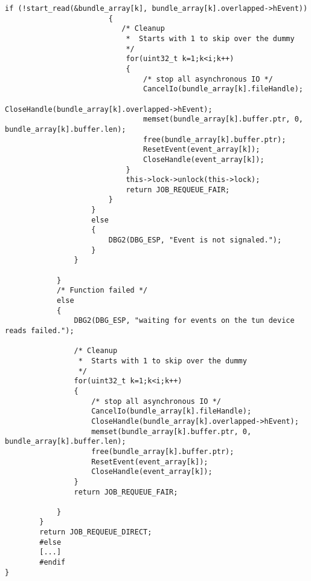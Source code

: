 \begin{lstlisting}[caption=Code für handle\_plain auf Windows,label=lst:handle-plain-windows]
                        if (!start_read(&bundle_array[k], bundle_array[k].overlapped->hEvent))
                        {
                           /* Cleanup
                            *  Starts with 1 to skip over the dummy
                            */
                            for(uint32_t k=1;k<i;k++)
                            {
                                /* stop all asynchronous IO */
                                CancelIo(bundle_array[k].fileHandle);
                                CloseHandle(bundle_array[k].overlapped->hEvent);
                                memset(bundle_array[k].buffer.ptr, 0, bundle_array[k].buffer.len);
                                free(bundle_array[k].buffer.ptr);
                                ResetEvent(event_array[k]);
                                CloseHandle(event_array[k]);
                            }
                            this->lock->unlock(this->lock);
                            return JOB_REQUEUE_FAIR;
                        }
                    }
                    else
                    {
                        DBG2(DBG_ESP, "Event is not signaled.");
                    }
                }

            }
            /* Function failed */
            else
            {
                DBG2(DBG_ESP, "waiting for events on the tun device reads failed.");

                /* Cleanup
                 *  Starts with 1 to skip over the dummy
                 */
                for(uint32_t k=1;k<i;k++)
                {
                    /* stop all asynchronous IO */
                    CancelIo(bundle_array[k].fileHandle);
                    CloseHandle(bundle_array[k].overlapped->hEvent);
                    memset(bundle_array[k].buffer.ptr, 0, bundle_array[k].buffer.len);
                    free(bundle_array[k].buffer.ptr);
                    ResetEvent(event_array[k]);
                    CloseHandle(event_array[k]);
                }
                return JOB_REQUEUE_FAIR;

            }
        }
        return JOB_REQUEUE_DIRECT;
        #else
        [...]
        #endif
}
\end{lstlisting}

